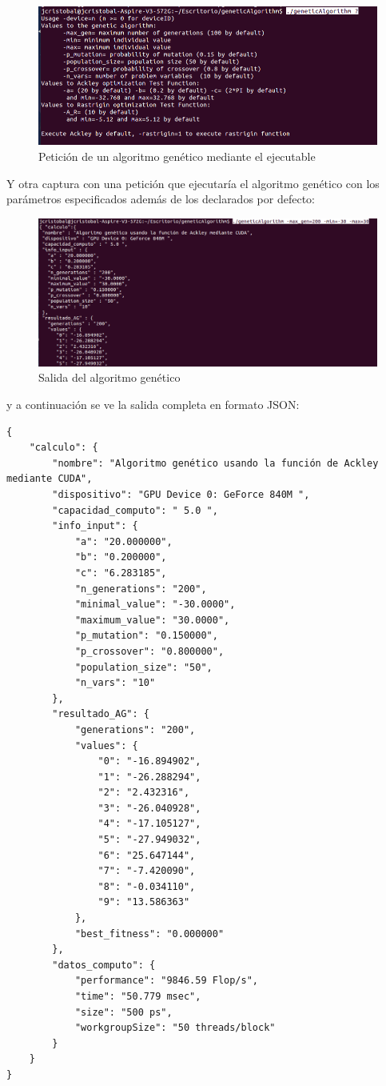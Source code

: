 \bigskip
\begin{figure}[h]
	\centering
	\includegraphics[width=1\linewidth]{../images/peticion_ejecutable}
	\caption[Petición de un algoritmo genético mediante el ejecutable]{Petición de un algoritmo genético mediante el ejecutable}
	\label{fig:peticion_ejecutable}
\end{figure}

\bigskip
Y otra captura con una petición que ejecutaría el algoritmo genético con los parámetros especificados además de los declarados por defecto:

\bigskip
\begin{figure}[h]
	\centering
	\includegraphics[width=1\linewidth]{../images/salida_ejecutable}
	\caption[Salida del algoritmo genético]{Salida del algoritmo genético}
	\label{fig:salida_ejecutable}
\end{figure}

\bigskip
y a continuación se ve la salida completa en formato JSON:

\begin{lstlisting}
{
	"calculo": {
		"nombre": "Algoritmo genético usando la función de Ackley mediante CUDA",
		"dispositivo": "GPU Device 0: GeForce 840M ",
		"capacidad_computo": " 5.0 ",
		"info_input": {
			"a": "20.000000",
			"b": "0.200000",
			"c": "6.283185",
			"n_generations": "200",
			"minimal_value": "-30.0000",
			"maximum_value": "30.0000",
			"p_mutation": "0.150000",
			"p_crossover": "0.800000",
			"population_size": "50",
			"n_vars": "10"
		},
		"resultado_AG": {
			"generations": "200",
			"values": {
				"0": "-16.894902",
				"1": "-26.288294",
				"2": "2.432316",
				"3": "-26.040928",
				"4": "-17.105127",
				"5": "-27.949032",
				"6": "25.647144",
				"7": "-7.420090",
				"8": "-0.034110",
				"9": "13.586363"
			},
			"best_fitness": "0.000000"
		},
		"datos_computo": {
			"performance": "9846.59 Flop/s",
			"time": "50.779 msec",
			"size": "500 ps",
			"workgroupSize": "50 threads/block"
		}
	}
}
\end{lstlisting}


